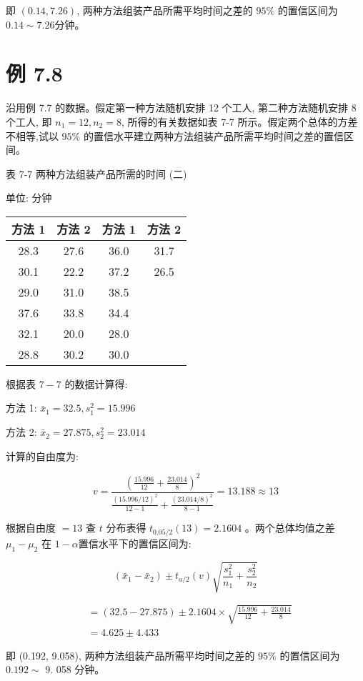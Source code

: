 \documentclass[10pt]{article}
\begin{document}
\begin{CJK*}{UTF8}{bsmi}
即 $(0.14,7.26)$, 两种方法组装产品所需平均时间之差的 $95 \%$ 的置信区间为 $0.14 \sim 7.26$分钟。

\section*{例 7.8}
沿用例 7.7 的数据。假定第一种方法随机安排 12 个工人, 第二种方法随机安排 8 个工人, 即 $n_{1}=12, n_{2}=8$, 所得的有关数据如表 7-7 所示。假定两个总体的方差不相等,试以 $95 \%$ 的置信水平建立两种方法组装产品所需平均时间之差的置信区间。

表 7-7 两种方法组装产品所需的时间 (二)

单位: 分钟

\begin{center}
\begin{tabular}{cc||cc}
\hline
方法 1 & 方法 2 & 方法 1 & 方法 2 \\
\hline
28.3 & 27.6 & 36.0 & 31.7 \\
30.1 & 22.2 & 37.2 & 26.5 \\
29.0 & 31.0 & 38.5 &  \\
37.6 & 33.8 & 34.4 &  \\
32.1 & 20.0 & 28.0 &  \\
28.8 & 30.2 & 30.0 &  \\
\hline
\end{tabular}
\end{center}

根据表 $7-7$ 的数据计算得:

方法 1: $\bar{x}_{1}=32.5, s_{1}^{2}=15.996$

方法 2: $\bar{x}_{2}=27.875, s_{2}^{2}=23.014$

计算的自由度为:

$$
v=\frac{\left(\frac{15.996}{12}+\frac{23.014}{8}\right)^{2}}{\frac{(15.996 / 12)^{2}}{12-1}+\frac{(23.014 / 8)^{2}}{8-1}}=13.188 \approx 13
$$

根据自由度 $=13$ 查 $t$ 分布表得 $t_{0.05 / 2}(13)=2.1604$ 。两个总体均值之差 $\mu_{1}-\mu_{2}$ 在 $1-\alpha$置信水平下的置信区间为:

$$
\left(\bar{x}_{1}-\bar{x}_{2}\right) \pm t_{a / 2}(v) \sqrt{\frac{s_{1}^{2}}{n_{1}}+\frac{s_{2}^{2}}{n_{2}}}
$$

$$
\begin{aligned}
& =(32.5-27.875) \pm 2.1604 \times \sqrt{\frac{15.996}{12}+\frac{23.014}{8}} \\
& =4.625 \pm 4.433
\end{aligned}
$$

即 (0.192, 9.058), 两种方法组装产品所需平均时间之差的 $95 \%$ 的置信区间为 $0.192 \sim$ 9. 058 分钟。


\end{CJK*}
\end{document}
